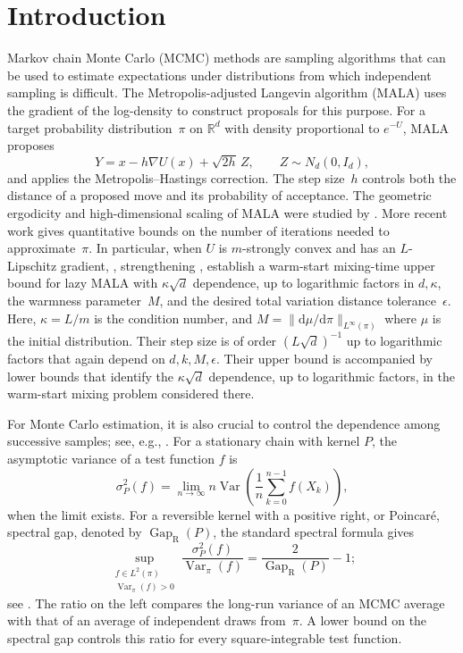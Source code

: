 \documentclass[11pt]{article}
\newcommand{\R}{\mathbb R}
\newcommand{\Var}{\operatorname{Var}}
\newcommand{\Gap}{\operatorname{Gap}_{\mathrm{R}}}
\newcommand{\1}{\mathbf 1}
\newcommand{\df}{\mathrm{d}}
\begin{document}
	\section{Introduction}
	
	
	Markov chain Monte Carlo (MCMC) methods are sampling algorithms that can be used to estimate expectations
	under distributions from which independent sampling is difficult.
	The Metropolis-adjusted Langevin algorithm (MALA) uses the gradient of
	the log-density to construct proposals for this purpose.
	For a target probability distribution~$\pi$ on $\R^d$ with density
	proportional to $e^{-U}$, MALA
	proposes
	\[
	Y=x-h\nabla U(x)+\sqrt{2h}\,Z,
	\qquad Z\sim N_d(0,I_d),
	\]
	and applies the Metropolis--Hastings correction. The step size~$h$ controls
	both the distance of a proposed move and its probability of acceptance.
	The geometric ergodicity and high-dimensional scaling of MALA were studied
	by \citet{RobertsTweedie1996,RobertsRosenthal1998}. More recent work gives
	quantitative bounds on the number of iterations needed to approximate~$\pi$.
	In particular, when $U$ is $m$-strongly convex and has an $L$-Lipschitz
	gradient, \citet{WuSchmidlerChen2022}, strengthening
	\citet{ChewiEtAl2021}, establish a warm-start mixing-time upper bound for lazy MALA with
	$\kappa\sqrt d$ dependence, up to logarithmic factors in $d, \kappa$, the warmness parameter~$M$, and the desired total variation distance tolerance~$\epsilon$.
	Here, $\kappa =L/m$ is the condition number, and $M = \|\df \mu/\df \pi\|_{L^{\infty}(\pi)}$ where $\mu$ is the initial distribution.
	Their step size is of order
	$(L\sqrt d)^{-1}$ up to logarithmic factors that again depend on $d,k,M,\epsilon$. 
	Their upper bound is accompanied by lower bounds that identify
	the $\kappa\sqrt d$ dependence, up to logarithmic factors, in the
	warm-start mixing problem considered there.
	
	
	For Monte Carlo estimation, it is also crucial to control the dependence
	among successive samples; see, e.g., \cite{Geyer1992,Sokal1997,JonesHobert2001,JonesQin2022}. For a stationary chain with kernel $P$,
	the asymptotic variance of a test function $f$ is
	\[
	\sigma_P^2(f)=\lim_{n\to\infty}
	n\Var\left(\frac1n\sum_{k=0}^{n-1}f(X_k)\right),
	\]
	when the limit exists. For a reversible kernel with a positive right,
	or Poincar\'e, spectral gap, denoted by $\Gap(P)$, the standard spectral
	formula gives
	\[
	\sup_{\substack{f\in L^2(\pi)\\\Var_\pi(f)>0}}
	\frac{\sigma_P^2(f)}{\Var_\pi(f)}
	=\frac{2}{\Gap(P)}-1;
	\]
	see \citet{KipnisVaradhan1986,RobertsRosenthal2008VarianceBounding}.
	The ratio on the left compares the long-run variance of an MCMC average
	with that of an average of independent draws from~$\pi$.
	A lower bound on the spectral gap controls this ratio for every
	square-integrable test function.
	
\end{document}
